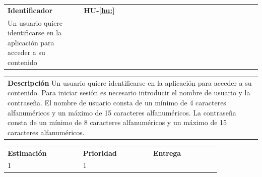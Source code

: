 \documentclass[11pt]{article}
\begin{document}
\begin{table}[H]
  \centering
  \begin{tabular}{p{0.3\linewidth}|p{0.7\linewidth}}
    \toprule
    \textbf{Identificador} & \textbf{HU-\ref{hu:}}\\
    Un usuario quiere identificarse en la aplicación para acceder a su contenido
    \bottomrule
  \end{tabular}

  \begin{tabular}{p{1.028\linewidth}}
    \textbf{Descripción}
    \midrule
    Un usuario quiere identificarse en la aplicación para acceder a su contenido. Para iniciar sesión es necesario introducir el nombre de usuario y la contraseña. El nombre de usuario consta de un mínimo de 4 caracteres alfanuméricos y un máximo de 15 caracteres alfanuméricos. La contraseña consta de un mínimo de 8 caracteres alfanuméricos y un máximo de 15 caracteres alfanuméricos.
  \end{tabular}

  \begin{tabular}{p{0.18\linewidth}|p{0.1\linewidth}|p{0.18\linewidth}|p{0.1\linewidth}|p{0.18\linewidth}|p{0.1\linewidth}}
    \toprule
    \textbf{Estimación} & & \textbf{Prioridad} & & \textbf{Entrega} & \\
    1 && 1 && \\
    \bottomrule
  \end{tabular}


\end{table}
\end{document}
